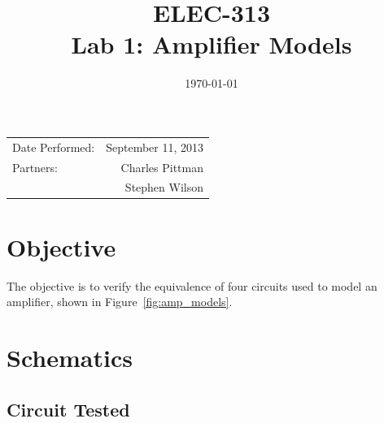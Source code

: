 \documentclass{article}
\author{}
\title{ELEC-313 \\ Lab 1: Amplifier Models \\ }
\date{\today}
\begin{document}
\maketitle %

 \begin{center}
   \begin{tabular}{lr}
    Date Performed: & September 11, 2013 \\
    Partners: & Charles Pittman \\
              & Stephen Wilson \\
  \end{tabular}
\end{center}

\pagebreak


\renewcommand{\labelenumi}{\alph{enumi}.}

\section{Objective}

\label{sec:objective}

The objective is to verify the equivalence of four circuits used to model an amplifier, shown in Figure~\ref{fig:amp_models}.

\section{Schematics}
\label{sec:schematics}

\subsection*{Circuit Tested}
\label{sec:ckt_tested}
\end{document}
